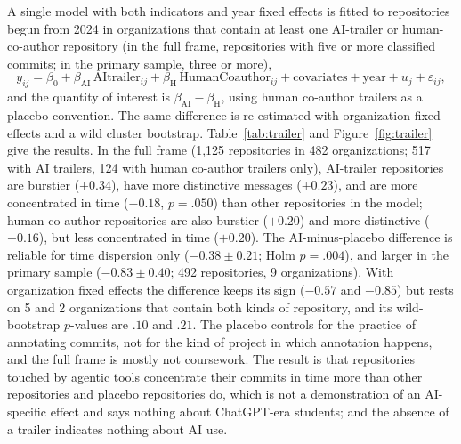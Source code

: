 \documentclass[acmsmall,screen,review,anonymous]{acmart}
\begin{document}
A single model with both indicators and year fixed effects is fitted to repositories begun from 2024 in organizations that contain at least one AI-trailer or human-co-author repository (in the full frame, repositories with five or more classified commits; in the primary sample, three or more),
\begin{equation}
y_{ij} = \beta_0 + \beta_{\mathrm{AI}}\,\mathrm{AItrailer}_{ij} + \beta_{\mathrm{H}}\,\mathrm{HumanCoauthor}_{ij} + \text{covariates} + \text{year} + u_j + \varepsilon_{ij},
\label{eq:trailer}
\end{equation}
and the quantity of interest is $\beta_{\mathrm{AI}} - \beta_{\mathrm{H}}$, using human co-author trailers as a placebo convention. The same difference is re-estimated with organization fixed effects and a wild cluster bootstrap. Table~\ref{tab:trailer} and Figure~\ref{fig:trailer} give the results. In the full frame (1,125 repositories in 482 organizations; 517 with AI trailers, 124 with human co-author trailers only), AI-trailer repositories are burstier ($+0.34$), have more distinctive messages ($+0.23$), and are more concentrated in time ($-0.18$, $p = .050$) than other repositories in the model; human-co-author repositories are also burstier ($+0.20$) and more distinctive ($+0.16$), but less concentrated in time ($+0.20$). The AI-minus-placebo difference is reliable for time dispersion only ($-0.38 \pm 0.21$; Holm $p = .004$), and larger in the primary sample ($-0.83 \pm 0.40$; 492 repositories, 9 organizations). With organization fixed effects the difference keeps its sign ($-0.57$ and $-0.85$) but rests on 5 and 2 organizations that contain both kinds of repository, and its wild-bootstrap $p$-values are $.10$ and $.21$. The placebo controls for the practice of annotating commits, not for the kind of project in which annotation happens, and the full frame is mostly not coursework. The result is that repositories touched by agentic tools concentrate their commits in time more than other repositories and placebo repositories do, which is not a demonstration of an AI-specific effect and says nothing about ChatGPT-era students; and the absence of a trailer indicates nothing about AI use.


\end{document}
